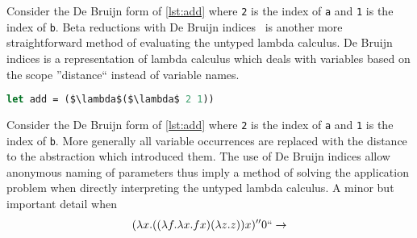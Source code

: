 \documentclass[11pt,oneside,a4paper]{report}
\begin{document}
Consider the De Bruijn form of \autoref{lst:add} where \texttt{2} is the index of \texttt{a} and \texttt{1} is the index of \texttt{b}.
Beta reductions with De Bruijn indices~\cite{de1972lambda} is another more straightforward method of evaluating the untyped lambda calculus.
De Bruijn indices is a representation of lambda calculus which deals with variables based on the scope ''distance`` instead of variable names.
\begin{lstlisting}[language=ML,caption={Add as De Bruijn},label={lst:adddebru},mathescape=true]
let add = ($\lambda$($\lambda$ 2 1))
\end{lstlisting}
Consider the De Bruijn form of \autoref{lst:add} where \texttt{2} is the index of \texttt{a} and \texttt{1} is the index of \texttt{b}.
More generally all variable occurrences are replaced with the distance to the abstraction which introduced them.
The use of De Bruijn indices allow anonymous naming of parameters thus imply a method of solving the application problem when directly interpreting the untyped lambda calculus.
A minor but important detail when 
\begin{align}
    &(\lambda x . ((\lambda f. \lambda x. f x)(\lambda z . z))x)''0`` \rightarrow\\
    &
\end{align}
\end{document}
